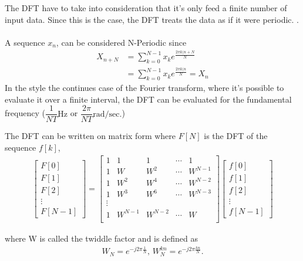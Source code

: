 
The DFT have to take into consideration that it's only feed a finite number of input data. Since this is the case, the DFT treats the data as if it were periodic.
.
\\\\
A sequence $x_n$, can be considered N-Periodic since 
\begin{align*}
	X_{n+N} 
	&= \sum_{k=0}^{N-1}x_k e^{\frac{2 \pi k (n+N}{N}}\\
	&= \sum_{k=0}^{N-1}x_k e^{\frac{2 \pi k (n}{N}} = X_n
\end{align*} 
In the style the continues case of the Fourier transform, where it's possible to evaluate it over a finite interval, the DFT can be evaluated for the fundamental frequency ($\dfrac{1}{NT} \text{Hz}$ or $\dfrac{2\pi}{NT} \text{rad/sec.}$) 

The DFT can be written on matrix form where $F[N]$ is the DFT of the sequence $f[k]$,
\begin{align*}
	\begin{bmatrix}
		F[0]\\ F[1]\\ F[2]\\ \vdots \\ F[N-1]
	\end{bmatrix}
	=
	\begin{bmatrix}
		1 & 1 	& 1   	& \cdots & 1\\
		1 & W 	& W^2 	& \cdots & W^{N-1}\\
		1 & W^2	& W^4	& \cdots & W^{N-2}\\
		1 & W^3	& W^6	& \cdots & W^{N-3}\\
		\vdots\\
		1 & W^{N-1}	& W^{N-2}	& \cdots & W\\
	\end{bmatrix}
	\begin{bmatrix}
		f[0]\\ f[1]\\ f[2]\\ \vdots \\ f[N-1]
	\end{bmatrix}
\end{align*}

where W is called the twiddle factor and is defined as 
\begin{align*}
	W_N = e^{-j 2 \pi\frac{1}{N}}, \, W_N^{kn} = e^{-j 2 \pi\frac{kn}{N}}.
\end{align*}

